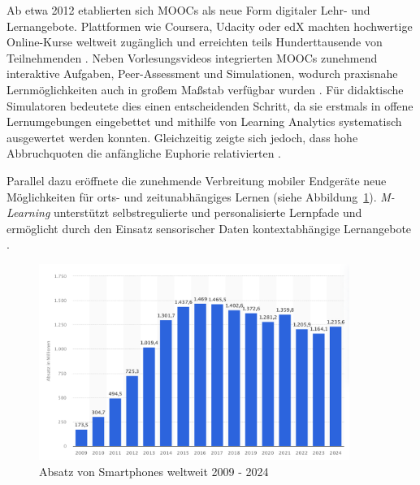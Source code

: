 Ab etwa 2012 etablierten sich \acp{MOOC} als neue Form digitaler Lehr- und Lernangebote. Plattformen wie Coursera, Udacity oder edX machten hochwertige Online-Kurse weltweit zugänglich und erreichten teils Hunderttausende von Teilnehmenden \parencite{pappano_year_2012}. Neben Vorlesungsvideos integrierten MOOCs zunehmend interaktive Aufgaben, Peer-Assessment und Simulationen, wodurch praxisnahe Lernmöglichkeiten auch in großem Maßstab verfügbar wurden \parencite[S.~5f]{yuan_moocs_2013}. Für didaktische Simulatoren bedeutete dies einen entscheidenden Schritt, da sie erstmals in offene Lernumgebungen eingebettet und mithilfe von Learning Analytics systematisch ausgewertet werden konnten. Gleichzeitig zeigte sich jedoch, dass hohe Abbruchquoten die anfängliche Euphorie relativierten \parencite[S.~1242]{khalil_moocs_2014}. 

Parallel dazu eröffnete die zunehmende Verbreitung mobiler Endgeräte neue Möglichkeiten für orts- und zeitunabhängiges Lernen (siehe Abbildung~\ref{fig:absatz_smartphones}). \textit{M-Learning} unterstützt selbstregulierte und personalisierte Lernpfade und ermöglicht durch den Einsatz sensorischer Daten kontextabhängige Lernangebote \parencite[S.~10]{sharples_theory_2010}.

\begin{figure}[htbp]
    \centering
    \includegraphics[width=0.90\textwidth]{img/Absatz von Smartphones.png}
    \caption{Absatz von Smartphones weltweit 2009 - 2024 \cite{statista_absatz_2025}}
    \label{fig:absatz_smartphones}
\end{figure}

